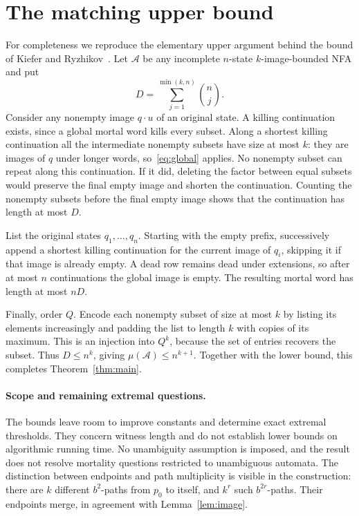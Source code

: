 \documentclass[acmsmall,screen,nonacm,11pt]{acmart}
\newcommand{\calA}{\mathcal{A}}
\begin{document}
\section{The matching upper bound}

For completeness we reproduce the elementary upper argument behind the
bound of Kiefer and Ryzhikov~\cite[Section~9]{KR2025}.
Let $\calA$ be any incomplete $n$-state $k$-image-bounded NFA and put
\[
 D=\sum_{j=1}^{\min(k,n)}\binom nj.
\]
Consider any nonempty image $q\cdot u$ of an original state.
A killing continuation exists, since a global mortal word kills every
subset. Along a shortest killing continuation all the intermediate
nonempty subsets have size at most $k$: they are images of $q$ under
longer words, so~\eqref{eq:global} applies.
No nonempty subset can repeat along this continuation. If it did, deleting
the factor between equal subsets would preserve the final empty image and
shorten the continuation. Counting the nonempty subsets before the final
empty image shows that the continuation has length at most $D$.

List the original states $q_1,\ldots,q_n$. Starting with the empty prefix,
successively append a shortest killing continuation for the current image
of $q_i$, skipping it if that image is already empty. A dead row remains
dead under extensions, so after at most $n$ continuations the global image
is empty. The resulting mortal word has length at most $nD$.

Finally, order $Q$. Encode each nonempty subset of size at most $k$ by
listing its elements increasingly and padding the list to length $k$ with
copies of its maximum. This is an injection into $Q^k$, because the set of
entries recovers the subset. Thus $D\leq n^k$, giving
$\mu(\calA)\leq n^{k+1}$. Together with the lower bound, this completes
Theorem~\ref{thm:main}.

\paragraph{Scope and remaining extremal questions.}
The bounds leave room to improve constants and determine exact extremal
thresholds. They concern witness length and do not establish lower bounds on
algorithmic running time. No unambiguity assumption is imposed, and the result
does not resolve mortality questions restricted to unambiguous automata.
The distinction
between endpoints and path multiplicity is visible in the construction:
there are $k$ different $b^2$-paths from $p_0$ to itself, and $k^r$ such
$b^{2r}$-paths. Their endpoints merge, in agreement with
Lemma~\ref{lem:image}.
\end{document}
